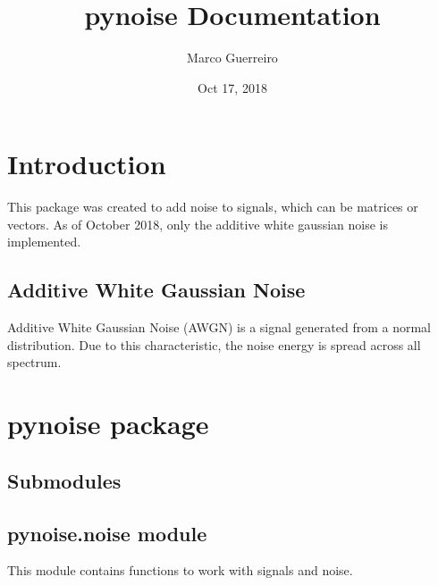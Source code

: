 \documentclass[letterpaper,10pt,english]{sphinxmanual}
\title{pynoise Documentation}
\date{Oct 17, 2018}
\author{Marco Guerreiro}
\begin{document}
\pagestyle{empty}
\maketitle
\pagestyle{plain}
\sphinxtableofcontents
\pagestyle{normal}
\label{\detokenize{index::doc}}



\chapter{Introduction}
\label{\detokenize{intro:introduction}}\label{\detokenize{intro::doc}}
This package was created to add noise to signals, which can be matrices or vectors. As of October 2018, only the additive white gaussian noise is implemented.


\section{Additive White Gaussian Noise}
\label{\detokenize{intro:additive-white-gaussian-noise}}
Additive White Gaussian Noise (AWGN) is a signal generated from a normal distribution. Due to this characteristic, the noise energy is spread across all spectrum.


\chapter{pynoise package}
\label{\detokenize{pynoise:pynoise-package}}\label{\detokenize{pynoise::doc}}

\section{Submodules}
\label{\detokenize{pynoise:submodules}}

\section{pynoise.noise module}
\label{\detokenize{pynoise:module-pynoise.noise}}\label{\detokenize{pynoise:pynoise-noise-module}}
This module contains functions to work with signals and noise.

\label{\detokenize{pynoise:module-noise}}
\end{document}
